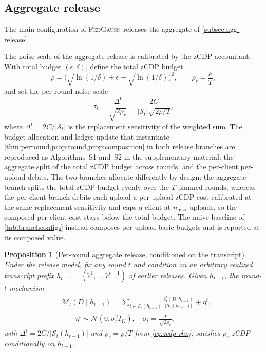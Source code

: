 \documentclass[a4paper,fleqn]{cas-dc}
\newtheorem{proposition}{Proposition}
\newcommand{\method}{\textsc{FedGauss}}
\begin{document}
\subsection{Aggregate release}
\label{subsec:agg-theory}
\par
The main configuration of \method\ releases the aggregate of
\cref{subsec:agg-release}.
\par
The noise scale of the aggregate release is calibrated by the zCDP
accountant. With total budget $(\epsilon,\delta)$, define the total zCDP
budget
\begin{equation}
\rho=\Big(\sqrt{\ln(1/\delta)+\epsilon}-\sqrt{\ln(1/\delta)}\Big)^2,
\qquad
\rho_r=\frac{\rho}{T},
\label{eq:zcdp-rho}
\end{equation}
and set the per-round noise scale
\begin{equation}
\sigma_t=\frac{\Delta^t}{\sqrt{2\rho_r}}=\frac{2C}{|\mathcal{S}_t|\sqrt{2\rho/T}},
\label{eq:zcdp-sigma}
\end{equation}
where $\Delta^t=2C/|\mathcal{S}_t|$ is the replacement sensitivity of the
weighted sum. The budget allocation and ledger update that instantiate
\cref{thm:perround,prop:round,prop:composition} in both release
branches are reproduced as Algorithms~S1 and~S2 in the supplementary
material: the aggregate split of the total zCDP budget across
rounds, and the per-client per-upload debits. The two branches allocate differently by
design: the aggregate branch splits the total zCDP budget evenly over the
$T$ planned rounds, whereas the per-client branch debits each upload a
per-upload zCDP cost calibrated at the same replacement sensitivity and caps
a client at $n_{\max}$ uploads, so the composed per-client cost stays below
the total budget. The naive baseline of \cref{tab:branchconfigs} instead
composes per-upload basic budgets and is reported at its composed value.
\par
\begin{proposition}[Per-round aggregate release, conditioned on the transcript]
\label{prop:round}
Under the release model, fix any round $t$ and condition on an arbitrary
realized transcript prefix $h_{t-1}=(\tilde c^1,\dots,\tilde c^{t-1})$ of
earlier releases. Given $h_{t-1}$, the round-$t$ mechanism
\begin{equation}
\begin{aligned}
& \mathcal{M}_t(D\mid h_{t-1})
= \sum_{i\in\mathcal{S}_t(h_{t-1})}
\frac{\bar c_i^t(D,h_{t-1})}{|\mathcal{S}_t(h_{t-1})|}
+ \eta^t,\\
&\qquad\eta^t \sim \mathcal{N}\!\left(0,\sigma_t^2 I_K\right),
\quad
\sigma_t = \frac{\Delta^t}{\sqrt{2\rho_r}},
\end{aligned}
\end{equation}
with $\Delta^t=2C/|\mathcal{S}_t(h_{t-1})|$ and $\rho_r=\rho/T$ from
\eqref{eq:zcdp-rho}, satisfies $\rho_r$-zCDP conditionally on $h_{t-1}$.
\end{proposition}
\end{document}

